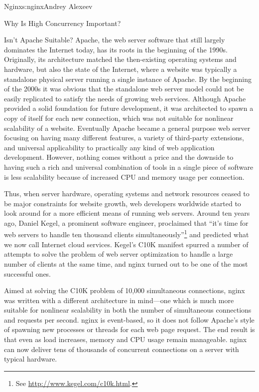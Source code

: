 \begin{aosachapter}{Nginx}{s:nginx}{Andrey Alexeev}
\begin{aosasect1}{Why Is High Concurrency Important?}
\begin{aosasect2}{Isn't Apache Suitable?}
Apache, the web server software that still largely dominates the
Internet today, has its roots in the beginning of the
1990s. Originally, its architecture matched the then-existing
operating systems and hardware, but also the state of the 
Internet, where a website was typically a standalone physical server
running a single instance of Apache. By the beginning of the 2000s it
was obvious that the standalone web server model could not be easily
replicated to satisfy the needs of growing web services. Although
Apache provided a solid foundation for future development, it was
architected to spawn a copy of itself for each new connection, which
was not suitable for nonlinear scalability of a website. Eventually
Apache became a general purpose web server focusing on having many
different features, a variety of third-party extensions, and universal
applicability to practically any kind of web application
development. However, nothing comes without a price and the downside
to having such a rich and universal combination of tools in a single
piece of software is less scalability because of increased CPU and
memory usage per connection.

Thus, when server hardware, operating systems and network resources
ceased to be major constraints for website growth, web developers
worldwide started to look around for a more efficient means of running
web servers. Around ten years ago, Daniel Kegel, a prominent software
engineer, proclaimed that ``it's time for web servers to handle ten
thousand clients simultaneously''\footnote{See
\url{http://www.kegel.com/c10k.html}.} and predicted what we
now call Internet cloud services. Kegel's C10K manifest spurred a
number of attempts to solve the problem of web server optimization to
handle a large number of clients at the same time, and nginx turned
out to be one of the most successful ones.

Aimed at solving the C10K problem of 10,000 simultaneous connections,
nginx was written with a different architecture in mind---one which is
much more suitable for nonlinear scalability in both the number of
simultaneous connections and requests per second. nginx is
event-based, so it does not follow Apache's style of spawning new
processes or threads for each web page request. The end result is that
even as load increases, memory and CPU usage remain manageable. nginx
can now deliver tens of thousands of concurrent connections on a
server with typical hardware.


\end{aosasect2}
\end{aosasect1}
\end{aosachapter}
